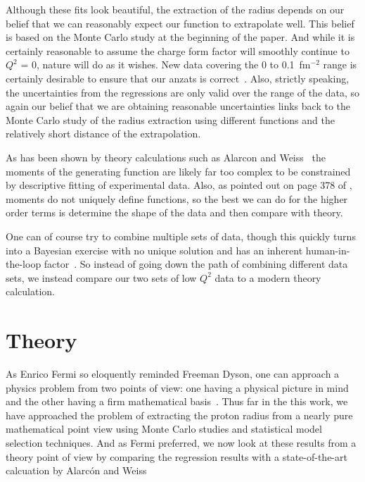 \documentclass[10pt,aps,prc,twocolumn]{revtex4-1}
\begin{document}
Although these fits look beautiful, the extraction of the radius depends on
our belief that we can reasonably expect our function to extrapolate well.
This belief is based on the Monte Carlo study at the beginning of the paper.    And while it is certainly reasonable
to assume the charge form factor will smoothly continue to $Q^2$ = 0,
nature will do as it wishes. New data covering the 0 to 0.1~fm$^{-2}$ range is 
certainly desirable to ensure that our anzats is correct~\cite{Gasparian:2014rna,
Peng:2016szv, Mihovilovic:2016rkr}.   
Also, strictly speaking, the
uncertainties from the regressions are only valid over the range of the data, so again our 
belief that we are obtaining reasonable uncertainties links back to the Monte Carlo study of the
radius extraction using different functions and the relatively short distance of the extrapolation.

As has been shown by theory calculations
such as Alarcon and Weiss~\cite{Alarcon:2017lhg,Alarcon:2018irp}
the moments of the generating function are likely far too complex to be constrained
by descriptive fitting of experimental data.  Also, as pointed out on page 378 of \cite{Sirca:2016}, 
moments do not uniquely define functions, so the best
we can do for the higher order terms is determine the shape of the data and then compare with theory.

One can of course try to combine multiple sets of data, though this quickly turns into a Bayesian exercise
with no unique solution and has an inherent human-in-the-loop factor~\cite{Daee:2018:UMA:3172944.3172989}.
So instead of going down the path of combining different data sets, we instead compare our two sets of 
low $Q^2$ data to a modern theory calculation.

\section{Theory}

As Enrico Fermi so eloquently reminded Freeman Dyson, one can approach a physics problem from two points
of view: one having a physical picture in mind and the other having a firm mathematical basis~\cite{Dyson:2004}.  
Thus far in the this work, we have approached the problem of extracting the proton radius from a nearly pure 
mathematical point view using Monte Carlo studies and statistical model selection techniques.  
And as Fermi preferred, we now look at these results from a theory point of view by comparing the 
regression results with a state-of-the-art calcuation by Alarc\'{o}n and 
Weiss~\cite{Alarcon:2018irp,Alarcon:2017ivh,Alarcon:2017chi,Alarcon:2017lhg,Alarcon:2012kn}
\end{document}
